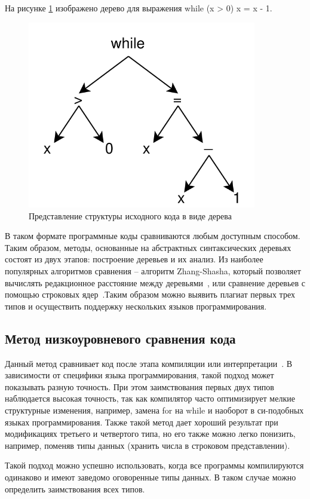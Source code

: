 На рисунке \ref{img:ast}  изображено дерево для выражения while (x > 0) x = x - 1.
\begin{figure}[!h]
	\centering
	\includegraphics[width=100mm]{img/ast2}
	\captionsetup{justification=centering}
	\centering\caption{Представление структуры исходного кода в виде дерева}
	\label{img:ast}
\end{figure}

В таком формате программные коды сравниваются любым доступным способом. Таким образом, методы, основанные на абстрактных синтаксических деревьях состоят из двух этапов: построение деревьев и их анализ. Из наиболее популярных алгоритмов сравнения -- алгоритм Zhang-Shasha, который позволяет вычислять редакционное расстояние между деревьями~\cite{zhang}, или сравнение деревьев с помощью строковых ядер~\cite{kernel}.Таким образом можно выявить плагиат первых трех типов и осуществить поддержку нескольких языков программирования. 

\subsection{Метод низкоуровневого сравнения кода}

Данный метод сравнивает код после этапа компиляции или интерпретации~\cite{binary}. В зависимости от специфики языка программирования, такой подход может показывать разную точность. При этом заимствования первых двух типов наблюдается высокая точность, так как компилятор часто оптимизирует мелкие структурные изменения, например, замена for на while и наоборот в си-подобных языках программирования. Также такой метод дает хороший результат при модификациях третьего и четвертого типа, но его также можно легко понизить, например, поменяв типы данных (хранить числа в строковом представлении).

Такой подход можно успешно использовать, когда все программы компилируются одинаково и  имеют заведомо оговоренные типы данных. В таком случае можно определить заимствования всех типов.
